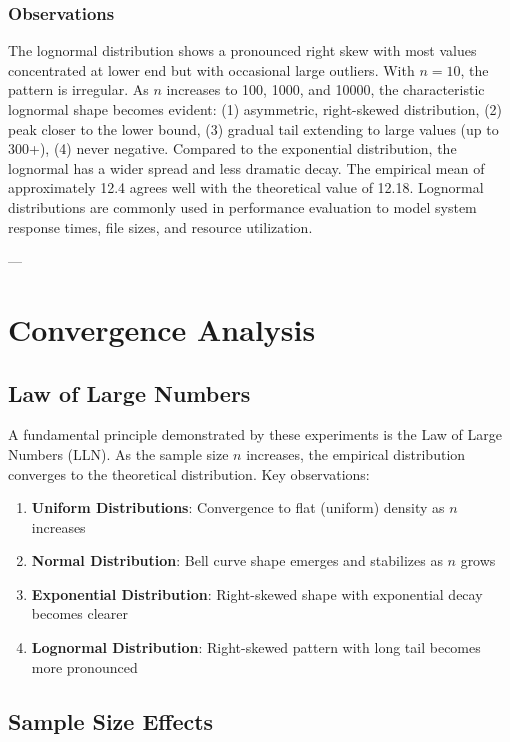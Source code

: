\documentclass[12pt]{article}
\begin{document}
\subsubsection{Observations}

The lognormal distribution shows a pronounced right skew with most values concentrated at lower end but with occasional large outliers. With $n=10$, the pattern is irregular. As $n$ increases to 100, 1000, and 10000, the characteristic lognormal shape becomes evident: (1) asymmetric, right-skewed distribution, (2) peak closer to the lower bound, (3) gradual tail extending to large values (up to 300+), (4) never negative. Compared to the exponential distribution, the lognormal has a wider spread and less dramatic decay. The empirical mean of approximately 12.4 agrees well with the theoretical value of 12.18. Lognormal distributions are commonly used in performance evaluation to model system response times, file sizes, and resource utilization.

---

\section{Convergence Analysis}

\subsection{Law of Large Numbers}

A fundamental principle demonstrated by these experiments is the Law of Large Numbers (LLN). As the sample size $n$ increases, the empirical distribution converges to the theoretical distribution. Key observations:

\begin{enumerate}
    \item \textbf{Uniform Distributions}: Convergence to flat (uniform) density as $n$ increases
    \item \textbf{Normal Distribution}: Bell curve shape emerges and stabilizes as $n$ grows
    \item \textbf{Exponential Distribution}: Right-skewed shape with exponential decay becomes clearer
    \item \textbf{Lognormal Distribution}: Right-skewed pattern with long tail becomes more pronounced
\end{enumerate}

\subsection{Sample Size Effects}
\end{document}
